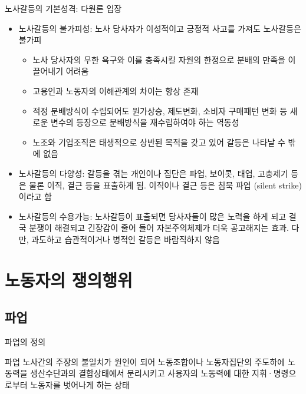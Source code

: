 \documentclass[aspectratio=169,xcolor=dvipsnames,handout]{beamer}
\begin{document}
\begin{frame}[allowframebreaks]{노사갈등의 기본성격: 다원론 입장}
    \begin{itemize}[<+->]
        \item 노사갈등의 불가피성: 노사 당사자가 이성적이고 긍정적 사고를 가져도 노사갈등은 불가피
        \begin{itemize}[<+->]
            \item 노사 당사자의 무한 욕구와 이를 충족시킬 자원의 한정으로 분배의 만족을 이끌어내기 어려움
            \item 고용인과 노동자의 이해관계의 차이는 항상 존재
            \item 적정 분배방식이 수립되어도 원가상승, 제도변화, 소비자 구매패턴 변화 등 새로운 변수의 등장으로 분배방식을 재수립하여야 하는 역동성
            \item 노조와 기업조직은 태생적으로 상반된 목적을 갖고 있어 갈등은 나타날 수 밖에 없음 
        \end{itemize}
        \item 노사갈등의 다양성: 갈등을 겪는 개인이나 집단은 파업, 보이콧, 태업, 고충제기 등은 물론 이직, 결근 등을 표출하게 됨. 이직이나 결근 등은 침묵 파업 (silent strike)이라고 함
        \item 노사갈등의 수용가능: 노사갈등이 표출되면 당사자들이 많은 노력을 하게 되고 결국 분쟁이 해결되고 긴장감이 줄어 들어 자본주의체제가 더욱 공고해지는 효과. 다만, 과도하고 습관적이거나 병적인 갈등은 바람직하지 않음
    \end{itemize}
\end{frame}

\section{노동자의 쟁의행위}
\subsection{파업}%

\begin{frame}{파업의 정의}
    \begin{block}{파업}
        노사간의 주장의 불일치가 원인이 되어 노동조합이나 노동자집단의 주도하에 노동력을 생산수단과의 결합상태에서 분리시키고 사용자의 노동력에 대한 지휘·명령으로부터 노동자를 벗어나게 하는 상태
    \end{block}
\end{frame}
\end{document}
